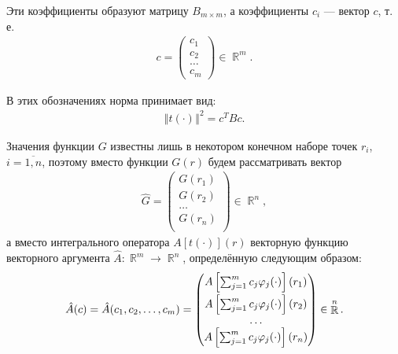 \documentclass[a4paper,14pt]{extarticle}
\DeclareMathOperator{\RR}{\mathbb{R}}
\newcommand{\norm}[1]{\left\Vert #1 \right\Vert}
\begin{document}
    Эти коэффициенты образуют матрицу $B_{m \times m} $, а коэффициенты $c_i$ --- вектор $c$, т. е.
    \begin{gather*}
        c =
        \begin{pmatrix}
            c_1 \\
            c_2 \\
            \ldots \\
            c_m
        \end{pmatrix}
        \in \RR^m.
    \end{gather*}

    В этих обозначениях норма принимает вид:
    \begin{gather*}
        \norm{t(\cdot)}^2
        = c^{T} B c.
    \end{gather*}

    Значения функции $G$ известны лишь в некотором конечном наборе точек $r_i$, $i = \overline{1, n}$, поэтому вместо функции $G(r)$ будем рассматривать вектор
    \begin{gather*}
        \hat{G} =
        \begin{pmatrix}
            G(r_1) \\
            G(r_2) \\
            \ldots \\
            G(r_n) \\
        \end{pmatrix}
        \in \RR^n,
    \end{gather*}
    а вместо интегрального оператора $A[t(\cdot)](r)$ векторную функцию векторного аргумента $\hat{A}: \RR^m \to \RR^n$, определённую следующим образом:
    \begin{gather*}
        \hat{A}(c) =
        \hat{A}(c_1, c_2, \ldots, c_m) =
        \begin{pmatrix}
            A\left[
                \sum_{j = 1}^m c_j \varphi_j(\cdot)
                \right] (r_1)
            \vspace{0.5ex} \\
            A\left[
                \sum_{j = 1}^m c_j \varphi_j(\cdot)
                \right] (r_2) \\
            \ldots \\
            A\left[
                \sum_{j = 1}^m c_j \varphi_j(\cdot)
                \right] (r_n) \\
        \end{pmatrix}
        \in \RR^n.
    \end{gather*}
\end{document}
